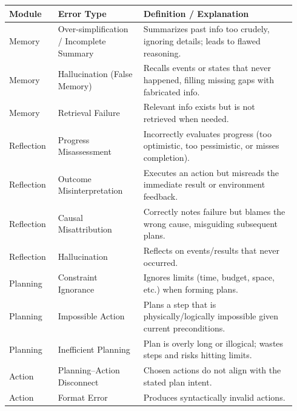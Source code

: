 \renewcommand{\arraystretch}{1.3} %
\setlength{\tabcolsep}{3pt}      %

\begin{table}[htbp]
\centering
\small
\begin{tabular}{p{0.16\linewidth} p{0.28\linewidth} p{0.50\linewidth}}
\toprule
\rowcolor{gray!15}
\textbf{Module} & \textbf{Error Type} & \textbf{Definition / Explanation} \\
\midrule

\rowcolor{orange!10}Memory   & Over-simplification / Incomplete Summary & Summarizes past info too crudely, ignoring details; leads to flawed reasoning. \\
\rowcolor{orange!10}Memory   & Hallucination (False Memory)             & Recalls events or states that never happened, filling missing gaps with fabricated info. \\
\rowcolor{orange!10}Memory   & Retrieval Failure                         & Relevant info exists but is not retrieved when needed. \\
\hline
\rowcolor{blue!10} Reflection & Progress Misassessment     & Incorrectly evaluates progress (too optimistic, too pessimistic, or misses completion). \\
\rowcolor{blue!10} Reflection & Outcome Misinterpretation  & Executes an action but misreads the immediate result or environment feedback. \\
\rowcolor{blue!10} Reflection & Causal Misattribution      & Correctly notes failure but blames the wrong cause, misguiding subsequent plans. \\
\rowcolor{blue!10} Reflection & Hallucination              & Reflects on events/results that never occurred. \\
\hline
\rowcolor{green!10}Planning & Constraint Ignorance   & Ignores limits (time, budget, space, etc.) when forming plans. \\
\rowcolor{green!10}Planning & Impossible Action      & Plans a step that is physically/logically impossible given current preconditions. \\
\rowcolor{green!10}Planning & Inefficient Planning   & Plan is overly long or illogical; wastes steps and risks hitting limits. \\
\hline
\rowcolor{yellow!15}Action & Planning--Action Disconnect & Chosen actions do not align with the stated plan intent. \\
\rowcolor{yellow!15}Action & Format Error                & Produces syntactically invalid actions. \\

\end{tabular}
\end{table}

